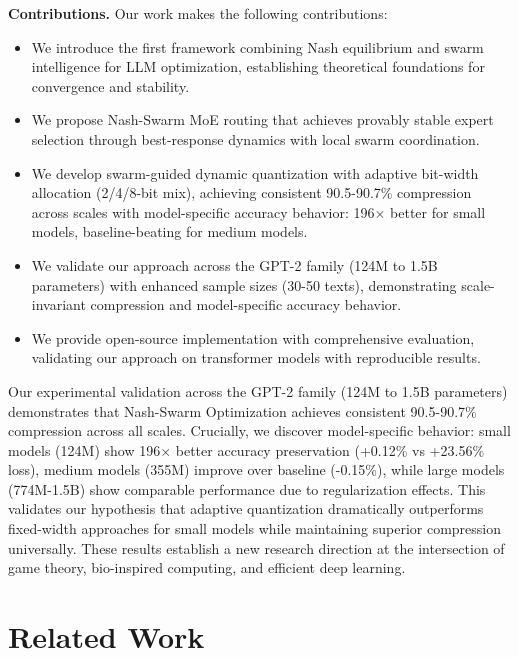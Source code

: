 \documentclass[11pt]{article}
\begin{document}
\textbf{Contributions.} Our work makes the following contributions:

\begin{itemize}
    \item We introduce the first framework combining Nash equilibrium and swarm intelligence for LLM optimization, establishing theoretical foundations for convergence and stability.
    
    \item We propose Nash-Swarm MoE routing that achieves provably stable expert selection through best-response dynamics with local swarm coordination.
    
    \item We develop swarm-guided dynamic quantization with adaptive bit-width allocation (2/4/8-bit mix), achieving consistent 90.5-90.7\% compression across scales with model-specific accuracy behavior: 196$\times$ better for small models, baseline-beating for medium models.
    
    \item We validate our approach across the GPT-2 family (124M to 1.5B parameters) with enhanced sample sizes (30-50 texts), demonstrating scale-invariant compression and model-specific accuracy behavior.
    
    \item We provide open-source implementation with comprehensive evaluation, validating our approach on transformer models with reproducible results.
\end{itemize}

Our experimental validation across the GPT-2 family (124M to 1.5B parameters) demonstrates that Nash-Swarm Optimization achieves consistent 90.5-90.7\% compression across all scales. Crucially, we discover model-specific behavior: small models (124M) show 196$\times$ better accuracy preservation (+0.12\% vs +23.56\% loss), medium models (355M) improve over baseline (-0.15\%), while large models (774M-1.5B) show comparable performance due to regularization effects. This validates our hypothesis that adaptive quantization dramatically outperforms fixed-width approaches for small models while maintaining superior compression universally. These results establish a new research direction at the intersection of game theory, bio-inspired computing, and efficient deep learning.

\section{Related Work}
\label{sec:related}
\end{document}
